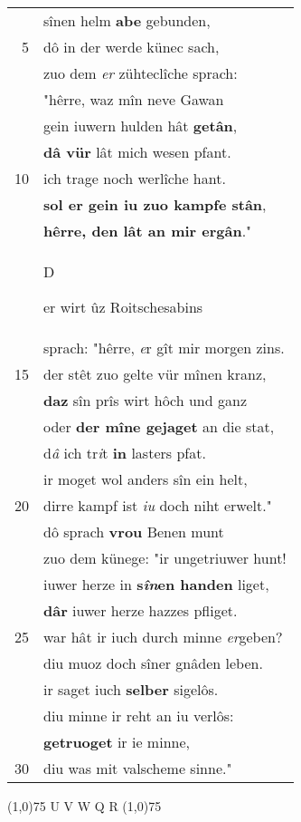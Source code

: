 \documentclass[8pt,a4paper,notitlepage]{article}
\begin{document}
\begin{table}[ht]
\begin{minipage}[t]{0.5\linewidth}
\begin{tabular}{rl}
 & sînen helm \textbf{abe} gebunden,\\ 
5 & dô in der werde künec sach,\\ 
 & zuo dem \textit{er} zühteclîche sprach:\\ 
 & "hêrre, waz mîn neve Gawan\\ 
 & gein iuwern hulden hât \textbf{getân},\\ 
 & \textbf{dâ vür} lât mich wesen pfant.\\ 
10 & ich trage noch werlîche hant.\\ 
 & \textbf{sol er gein iu zuo kampfe stân},\\ 
 & \textbf{hêrre, den lât an mir ergân}."\\ 
 & \begin{large}D\end{large}er wirt ûz Roitschesabins\\ 
 & sprach: "hêrre, \textit{e}r gît mir morgen zins.\\ 
15 & der stêt zuo gelte vür mînen kranz,\\ 
 & \textbf{daz} sîn prîs wirt hôch und ganz\\ 
 & oder \textbf{der mîne gejaget} an die stat,\\ 
 & d\textit{â} ich tr\textit{i}t \textbf{in} lasters pfat.\\ 
 & ir moget wol anders sîn ein helt,\\ 
20 & dirre kampf ist \textit{iu} doch niht erwelt."\\ 
 & dô sprach \textbf{vrou} Benen munt\\ 
 & zuo dem künege: "ir ungetriuwer hunt!\\ 
 & iuwer herze in \textbf{s\textit{în}en handen} liget,\\ 
 & \textbf{dâr} iuwer herze hazzes pfliget.\\ 
25 & war hât ir iuch durch minne \textit{er}geben?\\ 
 & diu muoz doch sîner gnâden leben.\\ 
 & ir saget iuch \textbf{selber} sigelôs.\\ 
 & diu minne ir reht an iu verlôs:\\ 
 & \textbf{getruoget} ir ie minne,\\ 
30 & diu was mit valscheme sinne."\\ 
\end{tabular}
\scriptsize
\line(1,0){75} \newline
U V W Q R \newline
\line(1,0){75} \newline

\end{minipage}
\end{table}
\end{document}
